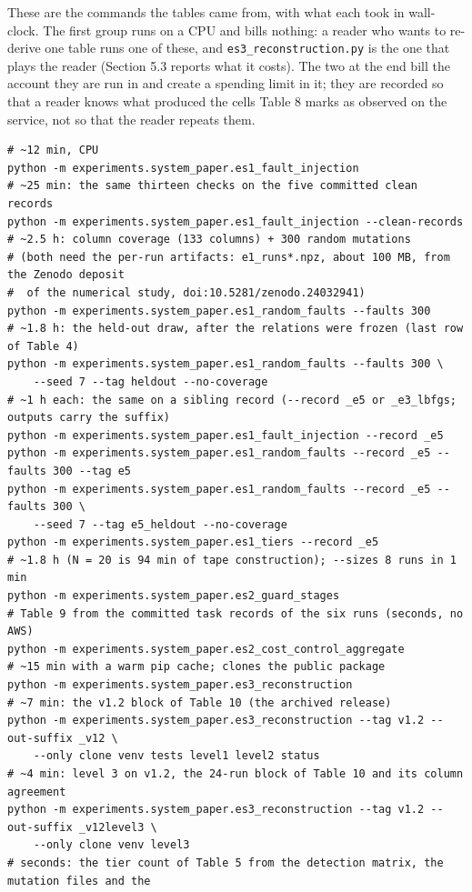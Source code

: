 \documentclass[acmsmall,screen,review]{acmart}
\begin{document}
These are the commands the tables came from, with what each took in wall-clock. The first group runs on a CPU and bills nothing: a reader who wants to re-derive one table runs one of these, and \texttt{es3\_\allowbreak{}reconstruction.\allowbreak{}py} is the one that plays the reader (Section 5.3 reports what it costs). The two at the end bill the account they are run in and create a spending limit in it; they are recorded so that a reader knows what produced the cells Table 8 marks as observed on the service, not so that the reader repeats them.


\begin{small}\begin{verbatim}
# ~12 min, CPU
python -m experiments.system_paper.es1_fault_injection
# ~25 min: the same thirteen checks on the five committed clean records
python -m experiments.system_paper.es1_fault_injection --clean-records
# ~2.5 h: column coverage (133 columns) + 300 random mutations
# (both need the per-run artifacts: e1_runs*.npz, about 100 MB, from the Zenodo deposit
#  of the numerical study, doi:10.5281/zenodo.24032941)
python -m experiments.system_paper.es1_random_faults --faults 300
# ~1.8 h: the held-out draw, after the relations were frozen (last row of Table 4)
python -m experiments.system_paper.es1_random_faults --faults 300 \
    --seed 7 --tag heldout --no-coverage
# ~1 h each: the same on a sibling record (--record _e5 or _e3_lbfgs; outputs carry the suffix)
python -m experiments.system_paper.es1_fault_injection --record _e5
python -m experiments.system_paper.es1_random_faults --record _e5 --faults 300 --tag e5
python -m experiments.system_paper.es1_random_faults --record _e5 --faults 300 \
    --seed 7 --tag e5_heldout --no-coverage
python -m experiments.system_paper.es1_tiers --record _e5
# ~1.8 h (N = 20 is 94 min of tape construction); --sizes 8 runs in 1 min
python -m experiments.system_paper.es2_guard_stages
# Table 9 from the committed task records of the six runs (seconds, no AWS)
python -m experiments.system_paper.es2_cost_control_aggregate
# ~15 min with a warm pip cache; clones the public package
python -m experiments.system_paper.es3_reconstruction
# ~7 min: the v1.2 block of Table 10 (the archived release)
python -m experiments.system_paper.es3_reconstruction --tag v1.2 --out-suffix _v12 \
    --only clone venv tests level1 level2 status
# ~4 min: level 3 on v1.2, the 24-run block of Table 10 and its column agreement
python -m experiments.system_paper.es3_reconstruction --tag v1.2 --out-suffix _v12level3 \
    --only clone venv level3
# seconds: the tier count of Table 5 from the detection matrix, the mutation files and the

\end{verbatim}
\end{small}
\end{document}

